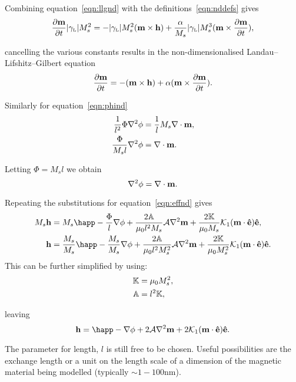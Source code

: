 Combining equation~\eqref{eqn:llgnd} with the definitions~\eqref{eqn:nddefs} gives
\begin{equation}
  \notag
  \frac{\partial \mathbf{m}}{\partial t} {|\gamma_{\text{\tiny{L}}}|} M_s^2 =
  - {|\gamma_{\text{\tiny{L}}}|} M_s^2 (\mathbf{m} \times \mathbf{h}) + \frac{\alpha}{M_s} {|\gamma_{\text{\tiny{L}}}|} M_s^3 (\mathbf{m} \times \frac{\partial \mathbf{m}}{\partial t}),
\end{equation}

cancelling the various constants results in the non-dimensionalised Landau--Lifshitz--Gilbert equation
\begin{equation}
  \label{eq:53}
  \frac{\partial \mathbf{m}}{\partial t} = - (\mathbf{m} \times \mathbf{h}) + \alpha (\mathbf{m} \times \frac{\partial \mathbf{m}}{\partial t}).
\end{equation}

Similarly for equation~\eqref{eqn:phind}
\begin{align*}
  \frac{1}{l^2} \Phi \nabla^{2} \phi &= \frac{1}{l} M_s \nabla \cdot \mathbf{m}, \\
  \frac{\Phi}{M_s l} \nabla^{2} \phi &= \nabla \cdot \mathbf{m}.
\end{align*}

Letting $\Phi = M_s l$ we obtain
\begin{equation}
  \label{eq:57}
  \nabla^2 \phi = \nabla \cdot \mathbf{m}.
\end{equation}

Repeating the substitutions for equation~\eqref{eqn:effnd} gives
\begin{align*}
  M_s \hv &= M_s \happ - \frac{\Phi}{l} \nabla \phi + \frac{2\nA}{\mu_0l^2 M_s}  \exchc \nabla^2 \mv + \frac{2\nK}{\mu_0 M_s}  \kone (\mv \cdot \ev) \ev, \\
  \hv &= \frac{M_s}{M_s} \happ - \frac{M_s}{M_s} \nabla \phi + \frac{2\nA}{\mu_0 l^2 M_s^2}  \exchc \nabla^2 \mv + \frac{2\nK}{\mu_0 M_s^2} \kone (\mv \cdot \ev) \ev.
\end{align*}
This can be further simplified by using:
\begin{align}
  \mathbb{K} &= \mu_0 M_s^2, \notag \\
  \mathbb{A} &= l^2 \mathbb{K}, \label{eqn:ndfields}
\end{align}

leaving
\begin{equation}
  \hv = \happ - \nabla \phi + 2\exchc \nabla^2 \mv + 2\kone (\mv \cdot \ev) \ev.
\end{equation}

The parameter for length, $l$ is still free to be chosen. Useful possibilities are the exchange length or a unit on the length scale of a dimension of the magnetic material being modelled (typically $\sim1-100$nm).


